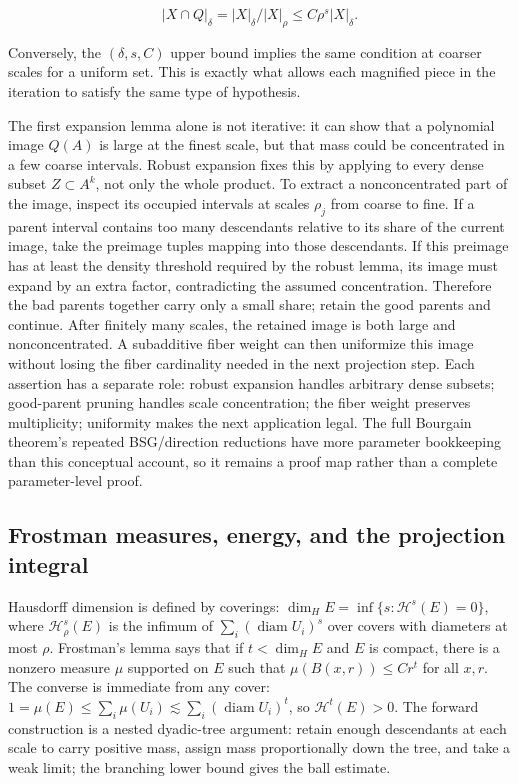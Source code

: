\[|X\cap Q|_\delta=|X|_\delta/|X|_\rho\le C\rho^s|X|_\delta.\]

Conversely, the \((\delta,s,C)\) upper bound implies the same condition at coarser scales for a uniform set. This is exactly what allows each magnified piece in the iteration to satisfy the same type of hypothesis.

The first expansion lemma alone is not iterative: it can show that a polynomial image \(Q(A)\) is large at the finest scale, but that mass could be concentrated in a few coarse intervals. Robust expansion fixes this by applying to every dense subset \(Z\subset A^k\), not only the whole product. To extract a nonconcentrated part of the image, inspect its occupied intervals at scales \(\rho_j\) from coarse to fine. If a parent interval contains too many descendants relative to its share of the current image, take the preimage tuples mapping into those descendants. If this preimage has at least the density threshold required by the robust lemma, its image must expand by an extra factor, contradicting the assumed concentration. Therefore the bad parents together carry only a small share; retain the good parents and continue. After finitely many scales, the retained image is both large and nonconcentrated. A subadditive fiber weight can then uniformize this image without losing the fiber cardinality needed in the next projection step. Each assertion has a separate role: robust expansion handles arbitrary dense subsets; good-parent pruning handles scale concentration; the fiber weight preserves multiplicity; uniformity makes the next application legal. The full Bourgain theorem's repeated BSG/direction reductions have more parameter bookkeeping than this conceptual account, so it remains a proof map rather than a complete parameter-level proof.

\subsection{Frostman measures, energy, and the projection integral}\label{04-visual-computing-ii-ch033-frostman-measures-energy-and-the-projection-integral}

\hypertarget{04-visual-computing-ii-ch033-frostman-measures-energy-and-the-projection-integral}{}

Hausdorff dimension is defined by coverings: \(\dim_H E=\inf\{s:\mathcal H^s(E)=0\}\), where \(\mathcal H^s_\rho(E)\) is the infimum of \(\sum_i(\operatorname{diam}U_i)^s\) over covers with diameters at most \(\rho\). Frostman's lemma says that if \(t<\dim_H E\) and \(E\) is compact, there is a nonzero measure \(\mu\) supported on \(E\) such that \(\mu(B(x,r))\le Cr^t\) for all \(x,r\). The converse is immediate from any cover: \(1=\mu(E)\le\sum_i\mu(U_i)\lesssim\sum_i(\operatorname{diam}U_i)^t\), so \(\mathcal H^t(E)>0\). The forward construction is a nested dyadic-tree argument: retain enough descendants at each scale to carry positive mass, assign mass proportionally down the tree, and take a weak limit; the branching lower bound gives the ball estimate.

